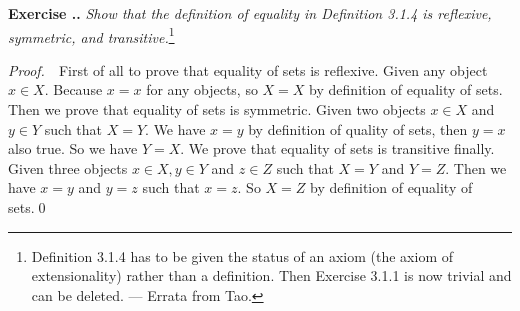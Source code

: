 \documentclass{book}
\newcommand{\pff}{\vspace{.25em}\noindent\emph{Proof.}~~}
\newcounter{Exercise}[section]
\renewcommand{\theExercise}{\thesection.\arabic{Exercise}.}
\newcommand{\new}{\vspace{1.5em}\noindent\textbf{{Exercise \stepcounter{Exercise}\textbf{\theExercise}}} }
\begin{document}
\new\emph{Show that the definition of equality in Definition 3.1.4 is reflexive, symmetric, and transitive.}\footnote{Definition 3.1.4 has to be given the status of an axiom (the axiom of extensionality) rather than a definition. Then Exercise 3.1.1 is now trivial and can be deleted. --- Errata from Tao.}

\pff First of all to prove that equality of sets is reflexive. Given any object $x\in X$. Because $x=x$ for any objects, so $X=X$ by definition of equality of sets. Then we prove that equality of sets is symmetric. Given two objects $x\in X$ and $y\in Y$ such that $X=Y$. We have $x=y$ by definition of quality of sets, then $y=x$ also true. So we have $Y=X$. We prove that equality of sets is transitive finally. Given three objects $x\in X,y\in Y$ and $z\in Z$ such that $X=Y$ and $Y=Z$. Then we have $x=y$ and $y=z$ such that $x=z$. So $X=Z$ by definition of equality of sets.\qed
\end{document}

